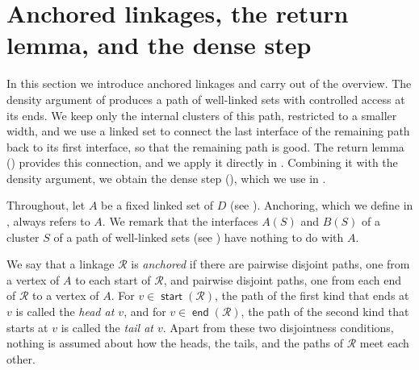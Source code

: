 \documentclass[fontsize=12pt,leading=14pt]{fullpaper}
\DeclareMathOperator{\st}{\mathsf{start}}
\DeclareMathOperator{\en}{\mathsf{end}}
\newcommand{\Rcal}{\mathcal{R}}
\newcounter{step}
\begin{document}
%
\section{Anchored linkages, the return lemma, and the dense step}\label{sec:anchor}

In this section we introduce anchored linkages and carry out  of the overview.
The density argument of  produces a path of well-linked sets with controlled access at its ends.
We keep only the internal clusters of this path, restricted to a smaller width, and we use a linked set to connect the last interface of the remaining path back to its first interface, so that the remaining path is good.
The return lemma () provides this connection, and we apply it directly in .
Combining it with the density argument, we obtain the dense step (), which we use in .

Throughout, let $A$ be a fixed linked set of $D$ (see ).
Anchoring, which we define in , always refers to $A$.
We remark that the interfaces $A(S)$ and $B(S)$ of a cluster $S$ of a path of well-linked sets (see ) have nothing to do with $A$.

\begin{definition}\label{def:anchored}
  We say that a linkage $\Rcal$ is \emph{anchored} if there are pairwise disjoint paths, one from a vertex of $A$ to each start of $\Rcal$, and pairwise disjoint paths, one from each end of $\Rcal$ to a vertex of $A$.
  For $v\in\st(\Rcal)$, the path of the first kind that ends at $v$ is called the \emph{head at $v$}, and for $v\in\en(\Rcal)$, the path of the second kind that starts at $v$ is called the \emph{tail at $v$}.
  Apart from these two disjointness conditions, nothing is assumed about how the heads, the tails, and the paths of $\Rcal$ meet each other.
\end{definition}
\end{document}
